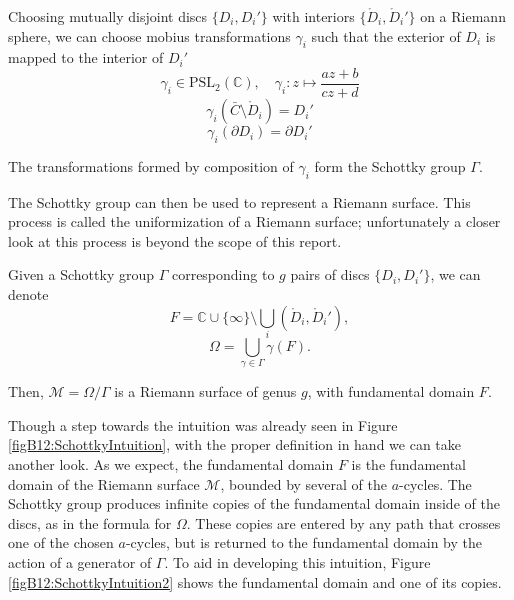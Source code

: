 \begin{definition}
    Choosing mutually disjoint discs $\{D_i,D_i'\}$ with interiors $\{\mathring{D}_i,\mathring{D}_i'\}$ on a Riemann sphere,
    we can choose mobius transformations $\gamma_i$ such that the exterior of $D_i$ is mapped to the interior of $D_i'$
    \begin{equation}
        \gamma_i \in \text{PSL}_2(\mathbb C) , \quad \gamma_i : z \mapsto \frac{az+b}{cz+d}
    \end{equation}
    \begin{equation}
        \gamma_i(\bar C \setminus \mathring{D}_i) = D_i'
    \end{equation}
    \begin{equation}
        \gamma_i(\partial D_i) = \partial D_i'
    \end{equation}

    The transformations formed by composition of $\gamma_i$ form the Schottky group $\Gamma$.
\end{definition}

The Schottky group can then be used to represent a Riemann surface.
This process is called the uniformization of a Riemann surface; unfortunately a closer look at this process is beyond the scope of this report.

\begin{definition}
    Given a Schottky group $\Gamma$ corresponding to $g$ pairs of discs $\{D_i,D_i'\}$, we can denote
    \begin{equation}
        F = \mathbb C \cup \{\infty\} \setminus \bigcup_i \left( \mathring{D}_i,\mathring{D}_i' \right),
    \end{equation}
    \begin{equation}
        \Omega = \bigcup_{\gamma \in \Gamma} \gamma(F).
    \end{equation}

    Then, $\mathcal M = \Omega / \Gamma$ is a Riemann surface of genus $g$, with fundamental domain $F$.
\end{definition}

Though a step towards the intuition was already seen in Figure \ref{figB12:SchottkyIntuition}, with the proper definition in hand we can take another look.
As we expect, the fundamental domain $F$ is the fundamental domain of the Riemann surface $\mathcal M$, bounded by several of the $a$-cycles.
The Schottky group produces infinite copies of the fundamental domain inside of the discs, as in the formula for $\Omega$.
These copies are entered by any path that crosses one of the chosen $a$-cycles, but is returned to the fundamental domain by the action of a generator of $\Gamma$.
To aid in developing this intuition, Figure \ref{figB12:SchottkyIntuition2} shows the fundamental domain and one of its copies.

